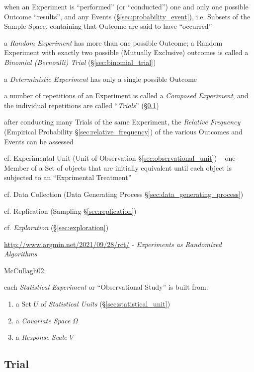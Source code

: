 when an Experiment is ``performed'' (or ``conducted'') one and only one possible
Outcome ``results'', and any Events (\S\ref{sec:probability_event}), i.e.
Subsets of the Sample Space, containing that Outcome are said to have
``occurred''

a \emph{Random Experiment} has more than one possible Outcome; a Random
Experiment with exactly two possible (Mutually Exclusive) outcomes is called a
\emph{Binomial (Bernoulli) Trial} (\S\ref{sec:binomial_trial})

a \emph{Deterministic Experiment} has only a single possible Outcome

a number of repetitions of an Experiment is called a \emph{Composed Experiment},
and the individual repetitions are called ``\emph{Trials}'' (\S\ref{sec:trial})

after conducting many Trials of the same Experiment, the \emph{Relative
  Frequency} (Empirical Probability \S\ref{sec:relative_frequency}) of the
various Outcomes and Events can be assessed

\fist cf. Experimental Unit (Unit of Observation \S\ref{sec:observational_unit})
-- one Member of a Set of objects that are initially equivalent until each
object is subjected to an ``Exprimental Treatment''

\fist cf. Data Collection (Data Generating Process
\S\ref{sec:data_generating_process})

\fist cf. Replication (Sampling \S\ref{sec:replication})

cf. \emph{Exploration} (\S\ref{sec:exploration})

\url{http://www.argmin.net/2021/09/28/rct/} - \emph{Experiments as Randomized
Algorithms}

\asterism


McCullagh02:

each \emph{Statistical Experiment} or ``Observational Study'' is built from:
\begin{enumerate}
  \item a Set $U$ of \emph{Statistical Units} (\S\ref{sec:statistical_unit})
  \item a \emph{Covariate Space} $\Omega$
  \item a \emph{Response Scale} $V$
\end{enumerate}



\subsection{Trial}\label{sec:trial}

